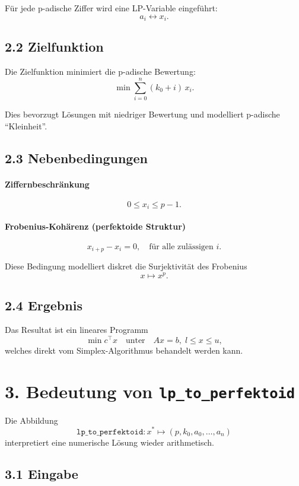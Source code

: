 \documentclass[11pt]{article}
\begin{document}
Für jede p-adische Ziffer wird eine LP-Variable eingeführt:
\[
a_i \longleftrightarrow x_i.
\]

\subsection*{2.2 Zielfunktion}

Die Zielfunktion minimiert die p-adische Bewertung:
\[
\min \sum_{i=0}^{n} (k_0 + i)\, x_i.
\]

Dies bevorzugt Lösungen mit niedriger Bewertung und modelliert p-adische
``Kleinheit''.

\subsection*{2.3 Nebenbedingungen}

\paragraph{Ziffernbeschränkung}
\[
0 \le x_i \le p-1.
\]

\paragraph{Frobenius-Kohärenz (perfektoide Struktur)}
\[
x_{i+p} - x_i = 0,
\quad \text{für alle zulässigen } i.
\]

Diese Bedingung modelliert diskret die Surjektivität des Frobenius
\[
x \mapsto x^p.
\]

\subsection*{2.4 Ergebnis}

Das Resultat ist ein lineares Programm
\[
\min c^\top x \quad \text{unter} \quad A x = b, \; l \le x \le u,
\]
welches direkt vom Simplex-Algorithmus behandelt werden kann.

\section*{3. Bedeutung von \texttt{lp\_to\_perfektoid}}

Die Abbildung
\[
\texttt{lp\_to\_perfektoid} :
x^\ast \longmapsto (p, k_0, a_0,\dots,a_n)
\]
interpretiert eine numerische Lösung wieder arithmetisch.

\subsection*{3.1 Eingabe}
\end{document}
